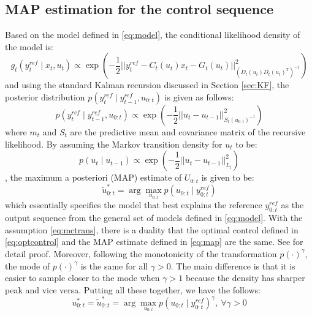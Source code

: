 \subsection{MAP estimation for the control sequence}
Based on the model defined in \eqref{eq:model}, the conditional likelihood density of the model is:
\begin{equation}
  g_t(y^{ref}_t \mid x_t, u_t) \propto \exp\left( -\dfrac{1}{2} \vert\vert y^{ref}_t - C_t(u_t)x_t - G_t(u_t) \vert\vert^2_{(D_t(u_t)D_t(u_t)^T)^{-1}}\right)
\end{equation}
and using the standard Kalman recursion discussed in Section \ref{sec:KF}, the posterior distribution $p(y^{ref}_t \mid y^{ref}_{t-1}, u_{0:t})$ is given as follows:
\begin{equation}
  p(y^{ref}_t \mid y^{ref}_{t-1}, u_{0:t}) \propto \exp\left( -\dfrac{1}{2} \vert\vert u_t - u_{t-1} \vert\vert^2_{S_t(u_{0:t})^{-1}}\right)
\end{equation}
where $m_t$ and $S_t$ are the predictive mean and covariance matrix of the recursive likelihood. By assuming the Markov transition density for $u_t$ to be:
\begin{equation}
  p(u_{t} \mid u_{t-1}) \propto  \exp\left( -\dfrac{1}{2} \vert\vert u_t - u_{t-1} \vert\vert^2_{L_t}\right)
\label{eq:mctrans}
\end{equation}
, the maximum a posteriori (MAP) estimate of $U_{0:t}$ is given to be:
\begin{equation}
  \tilde{u}^*_{0:t} = \arg\max_{u_{0:t}} p(u_{0:t} \mid y^{ref}_{0:t})
\label{eq:map}
\end{equation}
which essentially specifies the model that best explains the reference $y^{ref}_{0:t}$ as the output sequence from the general set of models defined in \eqref{eq:model}. With the assumption \ref{eq:mctrans}, there is a duality that the optimal control defined in \eqref{eq:optcontrol} and the MAP estimate defined in \eqref{eq:map} are the same. See \cite{NK11} for detail proof. Moreover, following the monotonicity of the transformation $p(\cdot)^\gamma$, the mode of $p(\cdot)^\gamma$ is the same for all $\gamma > 0$. The main difference is that it is easier to sample closer to the mode when $\gamma > 1$ because the density has sharper peak and vice versa. Putting all these together, we have the follows:
\begin{equation}
  u^*_{0:t} = \tilde{u}^*_{0:t} = \arg\max_{u_{0:t}} p(u_{0:t} \mid y^{ref}_{0:t})^\gamma,~\forall\gamma > 0
\end{equation}

